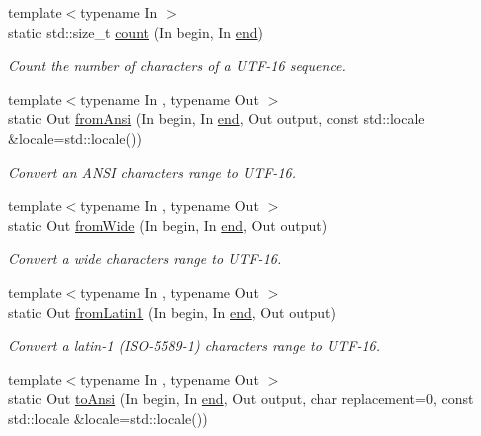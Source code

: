 \begin{DoxyCompactItemize}
{\footnotesize template$<$typename In $>$ }\\static std\-::size\-\_\-t \hyperlink{classsf_1_1_utf_3_0116_01_4_a6df8d9be8211ffe1095b3b82eac83f6f}{count} (In begin, In \hyperlink{gl3_8h_a432111147038972f06e049e18a837002}{end})
\begin{DoxyCompactList}\small\item\em Count the number of characters of a U\-T\-F-\/16 sequence. \end{DoxyCompactList}\item 
{\footnotesize template$<$typename In , typename Out $>$ }\\static Out \hyperlink{classsf_1_1_utf_3_0116_01_4_a8a595dc1ea57ecf7aad944964913f0ff}{from\-Ansi} (In begin, In \hyperlink{gl3_8h_a432111147038972f06e049e18a837002}{end}, Out output, const std\-::locale \&locale=std\-::locale())
\begin{DoxyCompactList}\small\item\em Convert an A\-N\-S\-I characters range to U\-T\-F-\/16. \end{DoxyCompactList}\item 
{\footnotesize template$<$typename In , typename Out $>$ }\\static Out \hyperlink{classsf_1_1_utf_3_0116_01_4_a263423929b6f8e4d3ad09b45ac5cb0a1}{from\-Wide} (In begin, In \hyperlink{gl3_8h_a432111147038972f06e049e18a837002}{end}, Out output)
\begin{DoxyCompactList}\small\item\em Convert a wide characters range to U\-T\-F-\/16. \end{DoxyCompactList}\item 
{\footnotesize template$<$typename In , typename Out $>$ }\\static Out \hyperlink{classsf_1_1_utf_3_0116_01_4_a52293df75893733fe6cf84b8a017cbf7}{from\-Latin1} (In begin, In \hyperlink{gl3_8h_a432111147038972f06e049e18a837002}{end}, Out output)
\begin{DoxyCompactList}\small\item\em Convert a latin-\/1 (I\-S\-O-\/5589-\/1) characters range to U\-T\-F-\/16. \end{DoxyCompactList}\item 
{\footnotesize template$<$typename In , typename Out $>$ }\\static Out \hyperlink{classsf_1_1_utf_3_0116_01_4_a6d2bfbdfe46364bd49bca28a410b18f7}{to\-Ansi} (In begin, In \hyperlink{gl3_8h_a432111147038972f06e049e18a837002}{end}, Out output, char replacement=0, const std\-::locale \&locale=std\-::locale())

\end{DoxyCompactItemize}
